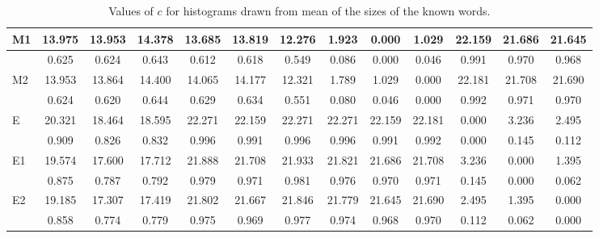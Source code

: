 \begin{table*}[h!]
\begin{center}
\begin{tabular}{| l | c | c | c | c | c | c | c | c | c | c | c | c |}
M1 & 13.975  & 13.953  & 14.378  & 13.685  & 13.819  & 12.276  & 1.923  & 0.000  & 1.029  & 22.159  & 21.686  & 21.645 \\\hline
 & 0.625  & 0.624  & 0.643  & 0.612  & 0.618  & 0.549  & 0.086  & 0.000  & 0.046  & 0.991  & 0.970  & 0.968 \\\hline
M2 & 13.953  & 13.864  & 14.400  & 14.065  & 14.177  & 12.321  & 1.789  & 1.029  & 0.000  & 22.181  & 21.708  & 21.690 \\\hline
 & 0.624  & 0.620  & 0.644  & 0.629  & 0.634  & 0.551  & 0.080  & 0.046  & 0.000  & 0.992  & 0.971  & 0.970 \\\hline
E & 20.321  & 18.464  & 18.595  & 22.271  & 22.159  & 22.271  & 22.271  & 22.159  & 22.181  & 0.000  & 3.236  & 2.495 \\\hline
 & 0.909  & 0.826  & 0.832  & 0.996  & 0.991  & 0.996  & 0.996  & 0.991  & 0.992  & 0.000  & 0.145  & 0.112 \\\hline
E1 & 19.574  & 17.600  & 17.712  & 21.888  & 21.708  & 21.933  & 21.821  & 21.686  & 21.708  & 3.236  & 0.000  & 1.395 \\\hline
 & 0.875  & 0.787  & 0.792  & 0.979  & 0.971  & 0.981  & 0.976  & 0.970  & 0.971  & 0.145  & 0.000  & 0.062 \\\hline
E2 & 19.185  & 17.307  & 17.419  & 21.802  & 21.667  & 21.846  & 21.779  & 21.645  & 21.690  & 2.495  & 1.395  & 0.000 \\\hline
 & 0.858  & 0.774  & 0.779  & 0.975  & 0.969  & 0.977  & 0.974  & 0.968  & 0.970  & 0.112  & 0.062  & 0.000 \\\hline
\end{tabular}
\caption{Values of $c$ for histograms drawn from mean of the sizes of the known words.}
\end{center}
\end{table*}